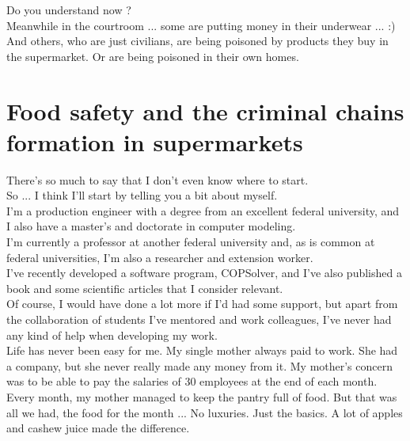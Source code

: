 \documentclass[11pt]{book}
\begin{document}
\noindent Do you understand now ? \\

\noindent Meanwhile in the courtroom ... some are putting money in their underwear ... :) \\

\noindent And others, who are just civilians, are being poisoned by products they buy in the supermarket. Or are being poisoned in their own homes. \\

\chapter{Food safety and the criminal chains formation in supermarkets}

\noindent There's so much to say that I don't even know where to start. \\

\noindent So ... I think I'll start by telling you a bit about myself. \\

\noindent I'm a production engineer with a degree from an excellent federal university, and I also have a master's and doctorate in computer modeling. \\

\noindent I'm currently a professor at another federal university and, as is common at federal universities, I'm also a researcher and extension worker.\\

\noindent I've recently developed a software program, COPSolver, and I've also published a book and some scientific articles that I consider relevant. \\

\noindent Of course, I would have done a lot more if I'd had some support, but apart from the collaboration of students I've mentored and work colleagues, I've never had any kind of help when developing my work. \\

\noindent Life has never been easy for me. My single mother always paid to work. She had a company, but she never really made any money from it. My mother's concern was to be able to pay the salaries of 30 employees at the end of each month. Every month, my mother managed to keep the pantry full of food. But that was all we had, the food for the month ... No luxuries. Just the basics. A lot of apples and cashew juice made the difference. \\
\end{document}
